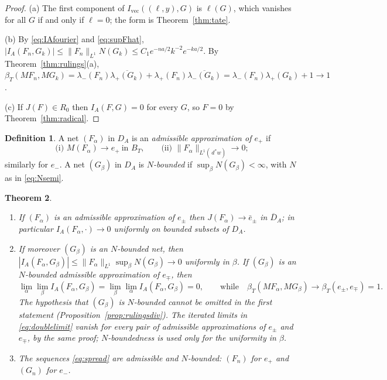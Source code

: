 \documentclass[11pt]{amsart}
\newtheorem{theorem}{Theorem}[section]
\theoremstyle{definition}
\newtheorem{definition}[theorem]{Definition}
\theoremstyle{remark}
\newcommand{\dstar}{\,d^{*}}
\newcommand{\DA}{D_A}
\newcommand{\BT}{B_T}
\newcommand{\NAd}{\overline{D}_A}
\begin{document}
\begin{proof}
(a)  The first component of $I_{\mathrm{vec}}((\ell,y),G)$ is $\ell(G)$, which
vanishes for all $G$ if and only if $\ell=0$; the form is
Theorem~\ref{thm:tate}.

(b)  By \eqref{eq:IAfourier} and \eqref{eq:supFhat},
$|I_A(F_n,G_k)|\le\lVert F_n\rVert_{L^{1}}N(G_k)\le
C_1e^{-na/2}k^{-2}e^{-ka/2}$.  By Theorem~\ref{thm:rulings}(a),
$\beta_T(MF_n,MG_k)=\lambda_-(F_n)\overline{\lambda_+(G_k)}+
\lambda_+(F_n)\overline{\lambda_-(G_k)}=\lambda_-(F_n)\lambda_+(G_k)+1\to1$.

(c)  If $J(F)\in R_0$ then $I_A(F,G)=0$ for every $G$, so $F=0$ by
Theorem~\ref{thm:radical}.
\end{proof}

\begin{definition}\label{def:admissible}
A net $(F_{\alpha})$ in $\DA$ is an \emph{admissible approximation of $e_+$} if
\begin{equation}\label{eq:admissible}
\text{(i) } M(F_{\alpha})\to e_+\ \text{in }\BT,\qquad
\text{(ii) } \lVert F_{\alpha}\rVert_{L^1(\dstar w)}\to0 ;
\end{equation}
similarly for $e_-$.  A net $(G_{\beta})$ in $\DA$ is \emph{$N$-bounded} if
$\sup_{\beta}N(G_{\beta})<\infty$, with $N$ as in \eqref{eq:Nsemi}.
\end{definition}

\begin{theorem}\label{thm:rulnullclass}
\begin{enumerate}
\item[(a)] If $(F_{\alpha})$ is an admissible approximation of $e_{\pm}$ then
$J(F_{\alpha})\to\bar e_{\pm}$ in $\NAd$; in particular
$I_A(F_{\alpha},\cdot)\to0$ uniformly on bounded subsets of $\DA$.
\item[(b)] If moreover $(G_{\beta})$ is an $N$-bounded net, then
$|I_A(F_{\alpha},G_{\beta})|\le\lVert F_{\alpha}\rVert_{L^1}\sup_{\beta}
N(G_{\beta})\to0$ uniformly in $\beta$.  If $(G_{\beta})$ is an $N$-bounded
admissible approximation of $e_{\mp}$, then
\begin{equation}\label{eq:doublelimit}
\lim_{\alpha}\lim_{\beta}I_A(F_{\alpha},G_{\beta})
=\lim_{\beta}\lim_{\alpha}I_A(F_{\alpha},G_{\beta})=0,\qquad\text{while}\quad
\beta_T(MF_{\alpha},MG_{\beta})\to\beta_T(e_{\pm},e_{\mp})=1 .
\end{equation}
The hypothesis that $(G_{\beta})$ is $N$-bounded cannot be omitted in the
first statement (Proposition~\ref{prop:rulingsdiv}).  The iterated limits in
\eqref{eq:doublelimit} vanish for every pair of admissible approximations of
$e_{\pm}$ and $e_{\mp}$, by the same proof; $N$-boundedness is used only for
the uniformity in $\beta$.
\item[(c)] The sequences \eqref{eq:spread} are admissible and $N$-bounded:
$(F_n)$ for $e_+$ and $(G_n)$ for $e_-$.
\end{enumerate}
\end{theorem}
\end{document}
